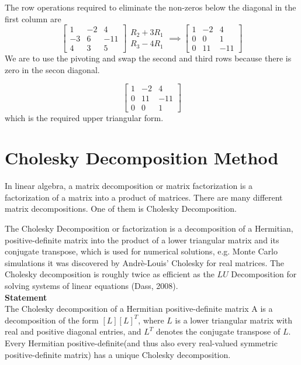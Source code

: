 \documentclass[a4paper, 12pt]{report}
\newcommand{\sps}{\\[0.2cm]}
\begin{document}
{      The row operations required to eliminate the non-zeros below the diagonal in the first column are     
     \begin{equation*}
     \begin{bmatrix} 1& -2& 4\\ -3& 6& -11\\ 4& 3& 5 \end{bmatrix}
     \begin{array}{c} R_2+3R_1\\R_3-4R_1 \end{array}
     \implies
     \begin{bmatrix} 1& -2& 4\\ 0& 0& 1\\ 0& 11& -11 \end{bmatrix}
     \end{equation*}
     We are to use the pivoting and swap the second and third rows because there is zero in the secon diagonal.
     
     \begin{equation*}
     \begin{bmatrix} 1& -2& 4\\ 0& 11& -11\\ 0& 0& 1 \end{bmatrix}
     \end{equation*}
     which is the required upper triangular form.
     
\section{Cholesky Decomposition Method}
In linear algebra, a matrix decomposition or matrix factorization is a factorization of a matrix into a product of matrices. There are many different matrix decompositions. One of them is Cholesky Decomposition.

The Cholesky Decomposition or factorization is a decomposition of a Hermitian, positive-definite matrix into the product of a lower triangular matrix and its conjugate transpose, which is used for numerical solutions, e.g. Monte Carlo simulations it was discovered by Andr\`{e}-Louis' Cholesky for real matrices. The Cholesky decomposition is roughly twice as efficient as the $LU$ Decomposition for solving systems of linear equations (Dass, 2008).\sps


\textbf{Statement}\sps
The Cholesky decomposition of a Hermitian positive-definite matrix A is a decomposition of the form $[L][L]^T$, where $L$ is a lower triangular matrix with real and positive diagonal entries, and $L^T$ denotes the conjugate transpose of $L$. Every Hermitian positive-definite(and thus also every real-valued symmetric positive-definite matrix) has a unique Cholesky decomposition.\\

}
\end{document}

